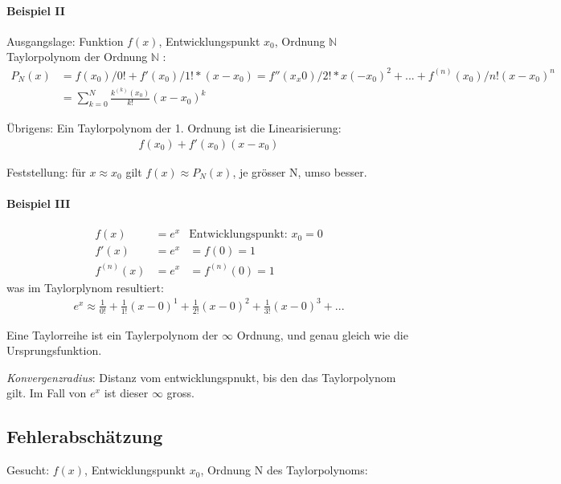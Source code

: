 \paragraph{Beispiel II}

Ausgangslage: Funktion $f(x)$, Entwicklungspunkt $x_0$, Ordnung $\mathbb{N}$ \\

Taylorpolynom der Ordnung $\mathbb{N}$ : 
\begin{align*}
P_N(x) &= f(x_0)/0! + f'(x_0)/1! * (x - x_0) = f''(x_x0) / 2! * x(-x_0)^2 + ... + f^(n)(x_0)/n! (x-x_0)^n \\
&= \sum^N_{k=0}{\frac{k^{(k)}(x_0)}{k!} (x-x_0)^k}
\end{align*}

Übrigens: Ein Taylorpolynom der 1. Ordnung ist die Linearisierung:
\begin{align*}
	f(x_0) + f'(x_0)(x-x_0)
\end{align*}

Feststellung: für $x \approx x_0$ gilt $f(x) \approx P_N(x)$, je grösser N, umso besser.


\paragraph{Beispiel III}

\begin{align*}
	f(x) &= e^x & \text{Entwicklungspunkt: } x_0=0 \\
	f'(x) &= e^x &= f(0) = 1\\
	f^{(n)}(x) &= e^x &= f^{(n)}(0) = 1
\end{align*}
was im Taylorplynom resultiert:
\begin{align*}
e^x \approx \frac{1}{0!} + \frac{1}{1!}(x-0)^1 + \frac{1}{2!}(x-0)^2 + \frac{1}{3!}(x-0)^3 + ...
\end{align*}

Eine Taylorreihe ist ein Taylerpolynom der $\infty$ Ordnung, und genau gleich wie die Ursprungsfunktion.

\emph{Konvergenzradius}: Distanz vom entwicklungspnukt, bis den das Taylorpolynom gilt. Im Fall von $e^x$ ist dieser $\infty$ gross.

\subsection{Fehlerabschätzung}

Gesucht: $f(x)$, Entwicklungspunkt $x_0$, Ordnung N des Taylorpolynoms:

